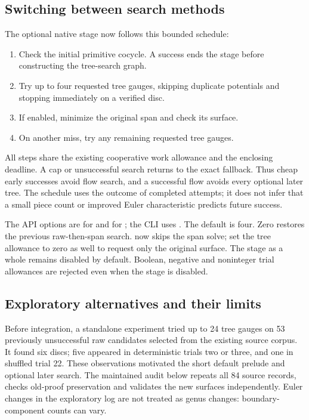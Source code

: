 \subsection{Switching between search methods}

The optional native stage now follows this bounded schedule:
\begin{enumerate}
\item Check the initial primitive cocycle. A success ends the stage
      before constructing the tree-search graph.
\item Try up to four requested tree gauges, skipping duplicate potentials
      and stopping immediately on a verified disc.
\item If enabled, minimize the original span and check its surface.
\item On another miss, try any remaining requested tree gauges.
\end{enumerate}
All steps share the existing cooperative work allowance and the enclosing
deadline. A cap or unsuccessful search returns  to the
exact fallback. Thus cheap early successes avoid flow search, and a
successful flow avoids every optional later tree. The schedule uses the
outcome of completed attempts; it does not infer that a small piece count
or improved Euler characteristic predicts future success.

The API options are  for 
and  for ; the CLI uses
. The default is four. Zero restores the
previous raw-then-span search.  now skips
the span solve; set the tree allowance to zero as well to request only
the original surface. The stage as a whole remains disabled by default.
Boolean, negative and noninteger trial allowances are rejected even when
the stage is disabled.

\subsection{Exploratory alternatives and their limits}

Before integration, a standalone experiment tried up to 24 tree gauges on
53 previously unsuccessful raw candidates selected from the existing
source corpus. It found six discs; five appeared in deterministic trials
two or three, and one in shuffled trial 22. These observations motivated
the short default prelude and optional later search. The maintained audit
below repeats all 84 source records, checks old-proof preservation and
validates the new surfaces independently. Euler changes in the exploratory
log are not treated as genus changes: boundary-component counts can vary.

